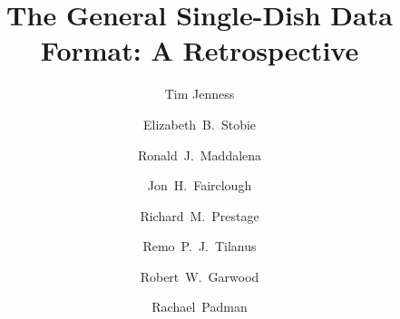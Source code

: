 \documentclass[final,authoryear,5p,times,twocolumn]{elsarticle}
\begin{document}
\begin{frontmatter}



\title{The General Single-Dish Data Format: A Retrospective}


\author[jac]{Tim Jenness}
\author[noao]{Elizabeth~B.~Stobie}
\author[nrao]{Ronald~J.~Maddalena}
\author[hp]{Jon~H.~Fairclough}
\author[nrao]{Richard~M.~Prestage}
\author[leiden,imapp]{Remo~P.~J.~Tilanus}
\author[nraocv]{Robert~W.~Garwood}
\author[mrao]{Rachael~Padman}


\address[jac]{Joint Astronomy Centre, 660 N.\ A`oh\=ok\=u Place, Hilo, HI
  96720, USA}
\address[noao]{National Optical Astronomy Observatory, 950 N Cherry Ave, Tucson, AZ 85719, USA}
\address[nrao]{National Radio Astronomy Observatory, P.O.\ Box 2, Green Bank, WV~24944, USA}
\address[hp]{Hewlett Packard Ltd}
\address[leiden]{Leiden Observatory, Leiden University, PO Box 9513, 2300 RA Leiden, The~Netherlands}
\address[imapp]{Department of Astrophysics,
     Institute for Mathematics, Astrophysics and Particle Physics,
     Radboud University Nijmegen, PO Box 9010, 6500 GL Nijmegen, The~Netherlands}
\address[nraocv]{National Radio Astronomy Observatory,
  Charlottesville, VA~22903-2475, USA}
\address[mrao]{Mullard Radio Astronomy Observatory,
Cavendish Laboratory, University of Cambridge,
JJ~Thomson~Avenue,
Cambridge, CB3~0HE, UK}


\end{frontmatter}
\end{document}
